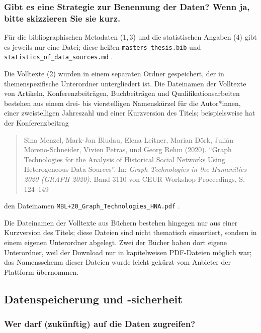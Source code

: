 \documentclass[%
  11pt,
  DIV=16,
  a4paper,
  BCOR=15mm,
  twoside=on,
  bibliography=totoc,
  headings=normal,
  numbers=noendperiod,
]{scrartcl}
\begin{document}
\subsubsection{Gibt es eine Strategie zur Benennung der Daten? Wenn ja, bitte skizzieren Sie sie kurz.}

Für die bibliographischen Metadaten (1,\,3) und die statistischen Angaben (4) gibt es jeweils nur eine Datei;
diese heißen \verb!masters_thesis.bib! und \verb!statistics_of_data_sources.md! .

Die Volltexte (2) wurden in einem separaten Ordner gespeichert, der in themenspezifische Unterordner
untergliedert ist. Die Dateinamen der Volltexte von Artikeln, Konferenzbeiträgen, Buchbeiträgen und Qualifikationsarbeiten
bestehen aus einem drei- bis vierstelligen Namenskürzel für die Autor*innen,
einer zweistelligen Jahreszahl und einer Kurzversion des Titels;
beispielsweise hat der Konferenzbeitrag
%
\begin{quote}
  {\textup
    Sina Menzel, Mark-Jan Bludau, Elena Leitner, Marian Dörk, Julián Moreno-Schneider, 
    Vivien Petras, und Georg Rehm (2020).
    \enquote{Graph Technologies for the Analysis of Historical Social Networks Using Heterogeneous Data Sources}.
    In: \emph{Graph Technologies in the Humanities 2020 (GRAPH 2020)}. Band 3110 von CEUR Workshop Proceedings, S.\,124–149%
  }
\end{quote}
%
den Dateinamen \verb!MBL+20_Graph_Technologies_HNA.pdf! .

Die Dateinamen der Volltexte aus Büchern bestehen hingegen nur aus einer Kurzversion des Titels;
diese Dateien sind nicht thematisch einsortiert, sondern in einem eigenen Unterordner abgelegt.
Zwei der Bücher haben dort eigene Unterordner, weil der Download nur in kapitelweisen PDF-Dateien
möglich war; das Namensschema dieser Dateien wurde leicht gekürzt vom Anbieter der Plattform übernommen.

\subsection{Datenspeicherung und -sicherheit}

\subsubsection{Wer darf (zukünftig) auf die Daten zugreifen?}
\end{document}
